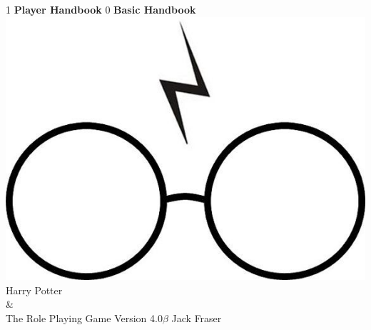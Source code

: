 \documentclass[oneside, twocolumn,9pt,english]{extbook}
\def\coreMode{1}
\begin{document}
\begin{titlepage}
    \centering
    \vfill
    \if\coreMode1
    {\bfseries
        {\HP \fontsize{40}{35}\selectfont Player Handbook}
    }    
    \fi
    \if\coreMode0
    {\bfseries
        {\HP \fontsize{40}{35}\selectfont Basic Handbook}
    } 
    \fi
    \vfill
    \includegraphics[scale = 0.7]{../Images/glasses} %
    \vfill
    {\HP \fontsize{30}{24} \selectfont  Harry Potter \\\&\\ The Role Playing Game}
    \normalsize
    \vfill
    {\HP \fontsize{22}{0} \selectfont Version 4.0$\beta$ \hfill Jack Fraser}
\end{titlepage}

\setcounter{tocdepth}{1}  
\begin{spacing}{0.8}
\footnotesize
\tableofcontents
\normalsize
\end{spacing}
















\end{document}
